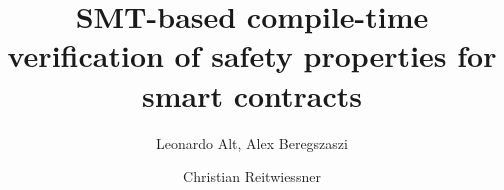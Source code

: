 \documentclass{llncs}
\begin{document}
\pagestyle{plain}

\title{SMT-based compile-time verification of safety properties for smart contracts}

\author{Leonardo Alt, Alex Beregszaszi \and Christian Reitwiessner}
\maketitle











\end{document}
